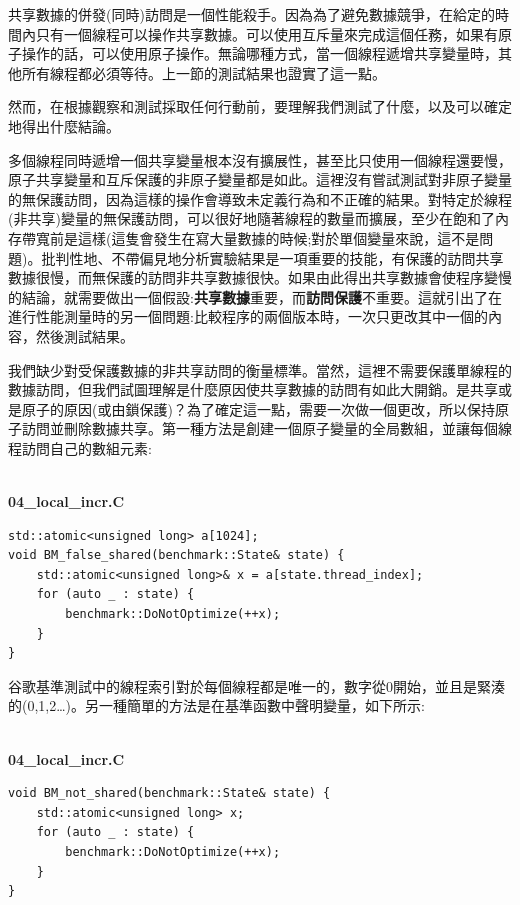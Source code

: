共享數據的併發(同時)訪問是一個性能殺手。因為為了避免數據競爭，在給定的時間內只有一個線程可以操作共享數據。可以使用互斥量來完成這個任務，如果有原子操作的話，可以使用原子操作。無論哪種方式，當一個線程遞增共享變量時，其他所有線程都必須等待。上一節的測試結果也證實了這一點。

然而，在根據觀察和測試採取任何行動前，要理解我們測試了什麼，以及可以確定地得出什麼結論。

多個線程同時遞增一個共享變量根本沒有擴展性，甚至比只使用一個線程還要慢，原子共享變量和互斥保護的非原子變量都是如此。這裡沒有嘗試測試對非原子變量的無保護訪問，因為這樣的操作會導致未定義行為和不正確的結果。對特定於線程(非共享)變量的無保護訪問，可以很好地隨著線程的數量而擴展，至少在飽和了內存帶寬前是這樣(這隻會發生在寫大量數據的時候;對於單個變量來說，這不是問題)。批判性地、不帶偏見地分析實驗結果是一項重要的技能，有保護的訪問共享數據很慢，而無保護的訪問非共享數據很快。如果由此得出共享數據會使程序變慢的結論，就需要做出一個假設:\textbf{共享數據}重要，而\textbf{訪問保護}不重要。這就引出了在進行性能測量時的另一個問題:比較程序的兩個版本時，一次只更改其中一個的內容，然後測試結果。

我們缺少對受保護數據的非共享訪問的衡量標準。當然，這裡不需要保護單線程的數據訪問，但我們試圖理解是什麼原因使共享數據的訪問有如此大開銷。是共享或是原子的原因(或由鎖保護)？為了確定這一點，需要一次做一個更改，所以保持原子訪問並刪除數據共享。第一種方法是創建一個原子變量的全局數組，並讓每個線程訪問自己的數組元素:

\hspace*{\fill} \\ %
\noindent
\textbf{04\_local\_incr.C}
\begin{lstlisting}[style=styleCXX]
std::atomic<unsigned long> a[1024];
void BM_false_shared(benchmark::State& state) {
	std::atomic<unsigned long>& x = a[state.thread_index];
	for (auto _ : state) {
		benchmark::DoNotOptimize(++x);
	}
}
\end{lstlisting}

谷歌基準測試中的線程索引對於每個線程都是唯一的，數字從0開始，並且是緊湊的(0,1,2…)。另一種簡單的方法是在基準函數中聲明變量，如下所示:

\hspace*{\fill} \\ %
\noindent
\textbf{04\_local\_incr.C}
\begin{lstlisting}[style=styleCXX]
void BM_not_shared(benchmark::State& state) {
	std::atomic<unsigned long> x;
	for (auto _ : state) {
		benchmark::DoNotOptimize(++x);
	}
}
\end{lstlisting}


